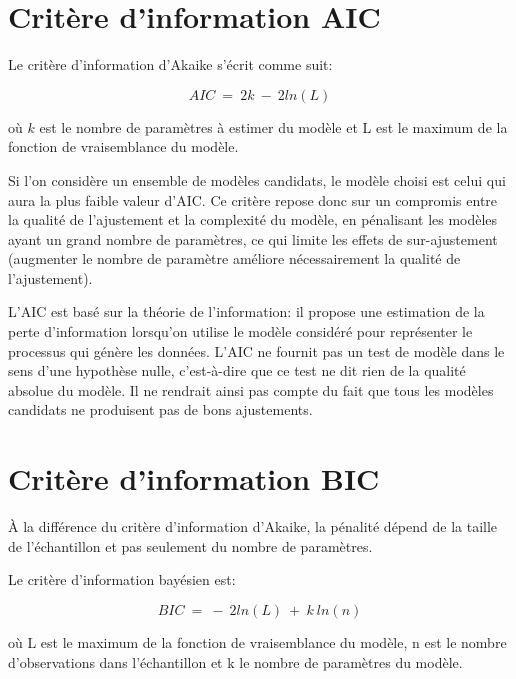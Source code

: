 \documentclass[11pt,fleqn]{book} %
\begin{document}
\newpage

\section{Critère d'information AIC}

\vspace{1em}

Le critère d'information d'Akaike s'écrit comme suit:

\[
AIC\:=\:2k\:-\:2ln(L)
\]

où $k$ est le nombre de paramètres à estimer du modèle et L est le maximum de la fonction de vraisemblance du modèle.

\vspace{1em}

Si l'on considère un ensemble de modèles candidats, le modèle choisi est celui qui aura la plus faible valeur d'AIC. Ce critère repose donc sur un compromis entre la qualité de l'ajustement et la complexité du modèle, en pénalisant les modèles ayant un grand nombre de paramètres, ce qui limite les effets de sur-ajustement (augmenter le nombre de paramètre améliore nécessairement la qualité de l'ajustement).

L'AIC est basé sur la théorie de l'information: il propose une estimation de la perte d'information lorsqu'on utilise le modèle considéré pour représenter le processus qui génère les données. L'AIC ne fournit pas un test de modèle dans le sens d'une hypothèse nulle, c'est-à-dire que ce test ne dit rien de la qualité absolue du modèle. Il ne rendrait ainsi pas compte du fait que tous les modèles candidats ne produisent pas de bons ajustements.

\vspace{1em}

\section{Critère d'information BIC}

\vspace{1em}

À la différence du critère d'information d'Akaike, la pénalité dépend de la taille de l'échantillon et pas seulement du nombre de paramètres.

\vspace{1em}

Le critère d'information bayésien est:

\[
BIC\:=\:-\:2ln(L)\:+\:k\:ln(n)
\]

où L est le maximum de la fonction de vraisemblance du modèle, n est le nombre d'observations dans l'échantillon et k le nombre de paramètres du modèle.
\end{document}
